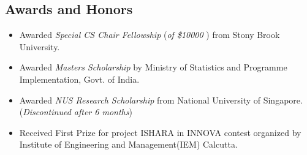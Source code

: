 \documentclass{res}
\begin{document}
\begin{resume}
\section{Awards and Honors}
   \begin{itemize}
   \item Awarded {\it Special CS Chair Fellowship} ({\it of \$10000} ) from Stony Brook University.
   \item Awarded {\it Masters Scholarship} by Ministry of Statistics and Programme Implementation, Govt. of India. 
   \item Awarded {\it NUS Research Scholarship} from National University of Singapore. ({\it Discontinued after 6 months})
   \item Received {\color{blue} First Prize} for project ISHARA in INNOVA contest organized by Institute of Engineering and Management(IEM) Calcutta.
   \end{itemize}

\end{resume}
\end{document}
